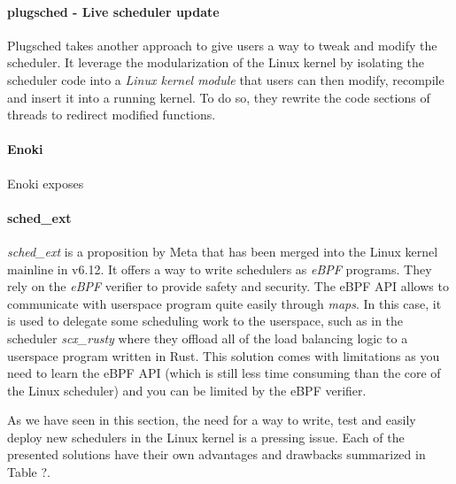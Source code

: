 \paragraph{plugsched - Live scheduler update}
\par Plugsched takes another approach to give users a way to tweak and modify the scheduler. It leverage the modularization of the Linux kernel by isolating the scheduler code into a \textit{Linux kernel module} that users can then modify, recompile and insert it into a running kernel. To do so, they rewrite the code sections of threads to redirect modified functions. 
\paragraph{Enoki} Enoki exposes 

\paragraph{sched\_ext}
\par \textit{sched\_ext} is a proposition by Meta that has been merged into the Linux kernel mainline in v6.12. It offers a way to write schedulers as \textit{eBPF} programs. They rely on the \textit{eBPF} verifier to provide safety and security. The eBPF API allows to communicate with userspace program quite easily through \textit{maps}. In this case, it is used to delegate some scheduling work to the userspace, such as in the scheduler \textit{scx\_rusty} where they offload all of the load balancing logic to a userspace program written in Rust. This solution comes with limitations as you need to learn the eBPF API (which is still less time consuming than the core of the Linux scheduler) and you can be limited by the eBPF verifier.\newline

\par As we have seen in this section, the need for a way to write, test and easily deploy new schedulers in the Linux kernel is a pressing issue. Each of the presented solutions have their own advantages and drawbacks summarized in Table ?.